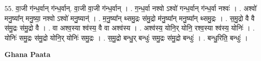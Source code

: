\documentclass[17pt]{extarticle}
\begin{document}
55. वा॒जी ग॑न्ध॒र्वान् ग॑न्ध॒र्वान्. वा॒जी वा॒जी ग॑न्ध॒र्वान् । . ग॒न्ध॒र्वा नश्वो ऽश्वो॑ गन्ध॒र्वान् ग॑न्ध॒र्वा नश्वः॑ । . अश्वो॑ मनु॒ष्या᳚न् मनु॒ष्या॒ नश्वो ऽश्वो॑ मनु॒ष्यान्॑ । . म॒नु॒ष्या᳚न् थ्समु॒द्रः स॑मु॒द्रो म॑नु॒ष्या᳚न् मनु॒ष्या᳚न् थ्समु॒द्रः । . स॒मु॒द्रो वै वै स॑मु॒द्रः स॑मु॒द्रो वै । . वा अश्व॒स्या श्व॑स्य॒ वै वा अश्व॑स्य । . अश्व॑स्य॒ योनि॒र् योनि॒ रश्व॒स्या श्व॑स्य॒ योनिः॑ । . योनिः॑ समु॒द्रः स॑मु॒द्रो योनि॒र् योनिः॑ समु॒द्रः । . स॒मु॒द्रो बन्धु॒र् बन्धुः॑ समु॒द्रः स॑मु॒द्रो बन्धुः॑ । . बन्धु॒रिति॒ बन्धुः॑ । \newline

\textbf{Ghana Paata } \newline
\end{document}
